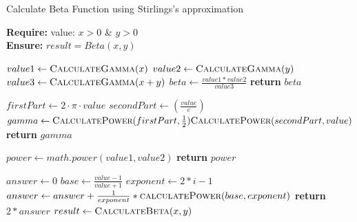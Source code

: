 \documentclass[a4paper, 12pt]{article}
\begin{document}
\begin{algorithm}
\caption{Calculate Beta Function using Stirlings's approximation}

\textbf{Require:}  value: $x > 0$ \& $y>0$  \\
\textbf{Ensure:} $result = Beta(x,y)$
\begin{algorithmic}[1]

    \State $value1 \leftarrow \Call{CalculateGamma}{x}$
    \State $value2 \leftarrow \Call{CalculateGamma}{y}$
    \State $value3 \leftarrow \Call{CalculateGamma}{x+y}$
    \State $beta \leftarrow \frac{value1 * value2}{value3}$
    \State \textbf{return} $beta$
    \EndProcedure
\Statex

    \State $firstPart \leftarrow 2 \cdot \pi \cdot value$
    \State $secondPart \leftarrow (\frac{value}{e})$
    \State $gamma \leftarrow \Call{CalculatePower}{firstPart,\frac{1}{2}} \Call{CalculatePower}{secondPart,value}$
    \State \textbf{return} $gamma$
    \EndProcedure
\Statex

    \State $power \leftarrow math.power(value1,value2)$
    \State \textbf{return} $power$
    \EndProcedure
\Statex

    \State $answer \leftarrow 0$
    \State $base \leftarrow \frac{value-1}{value+1}$
    \State $exponent \leftarrow 2 * i - 1$
    \State $answer \leftarrow answer + \frac{1}{exponent}*\Call{calculatePower}{base,exponent}$
    \EndFor
    \State \textbf{return} $2*answer$ 
    \EndProcedure
\Statex
\State $result \leftarrow \Call{CalculateBeta}{x,y} $

\end{algorithmic}
\end{algorithm}
\end{document}
